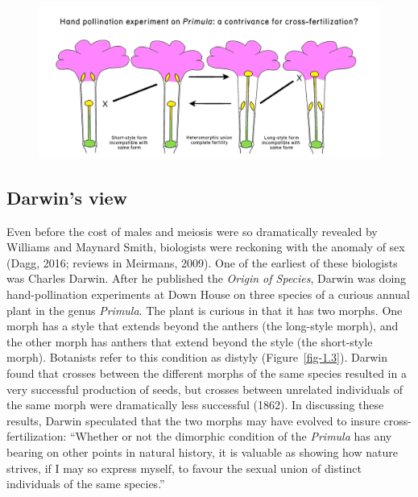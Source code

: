 \documentclass[
  letterpaper,
]{book}
\begin{document}
\begin{figure}


{\centering \includegraphics[width=1.25\textwidth,height=\textheight]{images/fig1-3.jpg}

}

\end{figure}

\hypertarget{darwins-view}{%
\subsection{Darwin's view}\label{darwins-view}}

Even before the cost of males and meiosis were so dramatically revealed
by Williams and Maynard Smith, biologists were reckoning with the
anomaly of sex (Dagg, 2016; reviews in Meirmans, 2009). One of the
earliest of these biologists was Charles Darwin. After he published the
\emph{Origin of Species}, Darwin was doing hand-pollination experiments
at Down House on three species of a curious annual plant in the genus
\emph{Primula}. The plant is curious in that it has two morphs. One
morph has a style that extends beyond the anthers (the long-style
morph), and the other morph has anthers that extend beyond the style
(the short-style morph). Botanists refer to this condition as distyly
(Figure~\ref{fig-1.3}). Darwin found that crosses between the different
morphs of the same species resulted in a very successful production of
seeds, but crosses between unrelated individuals of the same morph were
dramatically less successful (1862). In discussing these results, Darwin
speculated that the two morphs may have evolved to insure
cross-fertilization: ``Whether or not the dimorphic condition of the
\emph{Primula} has any bearing on other points in natural history, it is
valuable as showing how nature strives, if I may so express myself, to
favour the sexual union of distinct individuals of the same species.''
\end{document}
